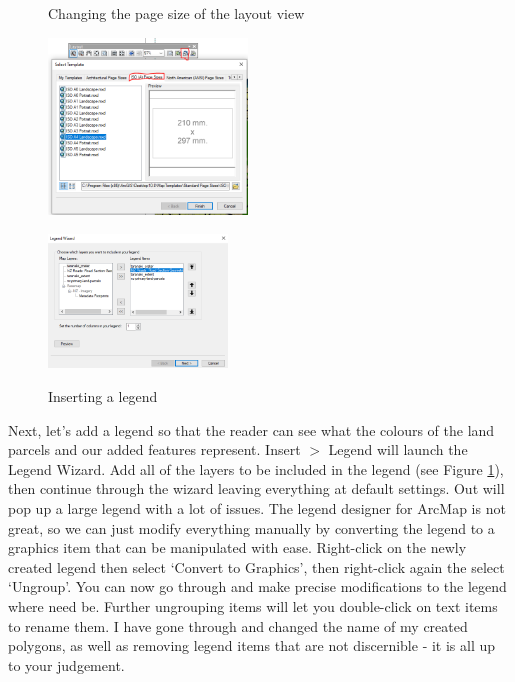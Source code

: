 \documentclass{article}
\begin{document}
\begin{figure}[h]
  \centering
  \begin{minipage}[b]{0.5\textwidth}
    \centering
    \caption{Changing the page size of the layout view}
    \includegraphics[width=200px]{images/part1/layout_changesize.PNG}
    \label{layout_changesize}
  \end{minipage}
  \hfill
  \begin{minipage}[b]{0.4\textwidth}
    \centering
    \caption{Inserting a legend}
    \includegraphics[width=180px]{images/part1/layout_legend.PNG}
    \label{layout_legend}
  \end{minipage}
\end{figure}

Next, let's add a legend so that the reader can see what the colours of the land parcels and our added features represent. Insert $>$ Legend will launch the Legend Wizard. Add all of the layers to be included in the legend (see Figure \ref{layout_legend}), then continue through the wizard leaving everything at default settings. Out will pop up a large legend with a lot of issues. The legend designer for ArcMap is not great, so we can just modify everything manually by converting the legend to a graphics item that can be manipulated with ease. Right-click on the newly created legend then select `Convert to Graphics', then right-click again the select `Ungroup'. You can now go through and make precise modifications to the legend where need be. Further ungrouping items will let you double-click on text items to rename them. I have gone through and changed the name of my created polygons, as well as removing legend items that are not discernible - it is all up to your judgement.\\
\end{document}

